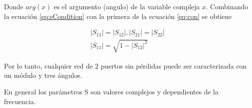 \begin{itemize}
Donde $arg(x)$ es el argumento (angulo) de la variable compleja $x$. Combinando la ecuación \ref{eq:sCondition} con la primera
de la ecuación \ref{eq:con} se obtiene

\begin{equation}
\begin{aligned}
	|S_{11}| = |S_{12}|, |S_{21}| = |S_{22}| \\
	|S_{11}| = \sqrt{1 - |S_{12}|^2}
\end{aligned}
\end{equation}

Por lo tanto, cualquier red de 2 puertos sin pérdidas puede ser caracterizada con un módulo y tres ángulos.
\end{itemize}

En general los parámetros S son valores complejos y dependientes de la frecuencia.
